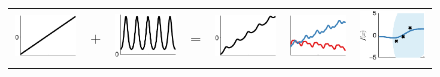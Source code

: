 \begin{figure}
\begin{tabular}{ccccc|c|c}
  \includegraphics[width=\fw]{../figures/structure_examples/lin_kernel} & $+$ & \includegraphics[width=\fw]{../figures/structure_examples/per_kernel} & = & \includegraphics[width=\fw]{../figures/structure_examples/lin_plus_per} & \includegraphics[width=\fw]{../figures/structure_examples/lin_plus_per_draws} & \includegraphics[width=\fw]{../figures/structure_examples/se_plus_lin_post} \\

\end{tabular}
\end{figure}
